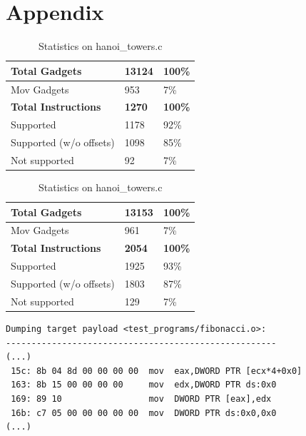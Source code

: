 \documentclass[10pt,twocolumn]{article}
\begin{document}
\appendix
\clearpage
\section{Appendix}
\label{appendix:a}
\begin{table}[!ht]
  \centering
  
  \bigskip

  \begin{tabular}{l|l|l}
    \textbf{Total Gadgets}      & \textbf{13124} & \textbf{100\%} \\ \hline
    Mov Gadgets                 & 953           &  7\%           \\
    \textbf{Total Instructions} & \textbf{1270} & \textbf{100\%} \\ \hline
    Supported                   & 1178          & 92\%           \\ \hline
    Supported (w/o offsets)     & 1098          & 85\%           \\ \hline
    Not supported               & 92            &  7\%
  \end{tabular}%
  \label{result-fibo}
  \caption{Statistics on fibonacci.c}

  \bigskip

  
  \bigskip

  \begin{tabular}{l|l|l}
    \textbf{Total Gadgets}      & \textbf{13153} & \textbf{100\%} \\ \hline
    Mov Gadgets                 & 961           & 7\%           \\
    \textbf{Total Instructions} & \textbf{2054} & \textbf{100\%} \\ \hline
    Supported                   & 1925          & 93\%           \\ \hline
    Supported (w/o offsets)     & 1803          & 87\%           \\ \hline
    Not supported               & 129           & 7\%
  \end{tabular}%
  \label{result-hanoi}
  \caption{Statistics on hanoi\_towers.c}
\end{table}

\begin{lstlisting}[float, caption=Sample movfuscator output]
Dumping target payload <test_programs/fibonacci.o>:
-----------------------------------------------------
(...)
 15c: 8b 04 8d 00 00 00 00  mov  eax,DWORD PTR [ecx*4+0x0]
 163: 8b 15 00 00 00 00     mov  edx,DWORD PTR ds:0x0
 169: 89 10                 mov  DWORD PTR [eax],edx
 16b: c7 05 00 00 00 00 00  mov  DWORD PTR ds:0x0,0x0
(...)
\end{lstlisting}


\end{document}

